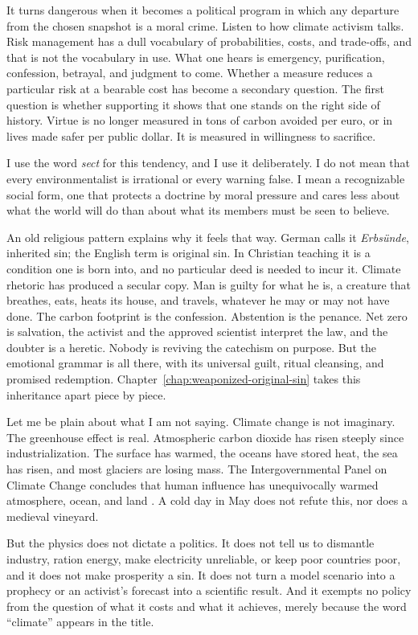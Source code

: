 \documentclass[12pt,a4paper]{book}
\begin{document}
It turns dangerous when it becomes a political program in which any departure from the chosen snapshot is a moral crime. Listen to how climate activism talks. Risk management has a dull vocabulary of probabilities, costs, and trade-offs, and that is not the vocabulary in use. What one hears is emergency, purification, confession, betrayal, and judgment to come. Whether a measure reduces a particular risk at a bearable cost has become a secondary question. The first question is whether supporting it shows that one stands on the right side of history. Virtue is no longer measured in tons of carbon avoided per euro, or in lives made safer per public dollar. It is measured in willingness to sacrifice.

I use the word \emph{sect} for this tendency, and I use it deliberately. I do not mean that every environmentalist is irrational or every warning false. I mean a recognizable social form, one that protects a doctrine by moral pressure and cares less about what the world will do than about what its members must be seen to believe.

An old religious pattern explains why it feels that way. German calls it \emph{Erbs\"unde}, inherited sin; the English term is original sin. In Christian teaching it is a condition one is born into, and no particular deed is needed to incur it. Climate rhetoric has produced a secular copy. Man is guilty for what he is, a creature that breathes, eats, heats its house, and travels, whatever he may or may not have done. The carbon footprint is the confession. Abstention is the penance. Net zero is salvation, the activist and the approved scientist interpret the law, and the doubter is a heretic. Nobody is reviving the catechism on purpose. But the emotional grammar is all there, with its universal guilt, ritual cleansing, and promised redemption. Chapter~\ref{chap:weaponized-original-sin} takes this inheritance apart piece by piece.

Let me be plain about what I am not saying. Climate change is not imaginary. The greenhouse effect is real. Atmospheric carbon dioxide has risen steeply since industrialization. The surface has warmed, the oceans have stored heat, the sea has risen, and most glaciers are losing mass. The Intergovernmental Panel on Climate Change concludes that human influence has unequivocally warmed atmosphere, ocean, and land \cite{IPCC2021HumanInfluence,IPCC2023Synthesis}. A cold day in May does not refute this, nor does a medieval vineyard.

But the physics does not dictate a politics. It does not tell us to dismantle industry, ration energy, make electricity unreliable, or keep poor countries poor, and it does not make prosperity a sin. It does not turn a model scenario into a prophecy or an activist's forecast into a scientific result. And it exempts no policy from the question of what it costs and what it achieves, merely because the word ``climate'' appears in the title.
\end{document}
